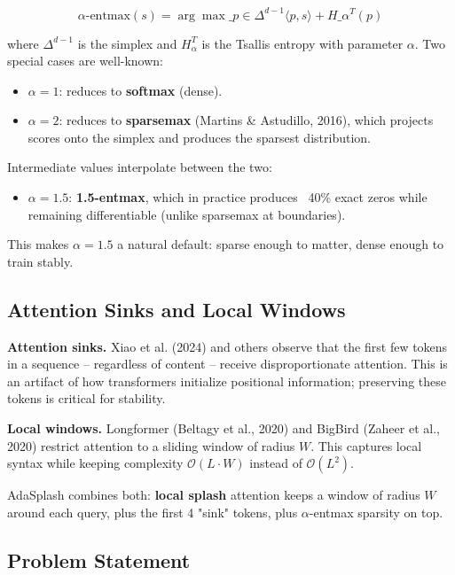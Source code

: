 \[
\text{$\alpha$-entmax}(s) = \arg\max\_{p \in \Delta^{d-1}} \langle p, s \rangle + H\_\alpha^T(p)
\tag{1.2}
\]

where $\Delta^{d-1}$ is the simplex and $H_\alpha^T$ is the Tsallis entropy 
with parameter $\alpha$. Two special cases are well-known:

\begin{itemize}
\item $\alpha = 1$: reduces to \textbf{softmax} (dense).
\item $\alpha = 2$: reduces to \textbf{sparsemax} (Martins \& Astudillo, 2016),
  which projects scores onto the simplex and produces the sparsest
  distribution.

\end{itemize}
Intermediate values interpolate between the two:

\begin{itemize}
\item $\alpha = 1.5$: \textbf{1.5-entmax}, which in practice produces ~40\% exact zeros
  while remaining differentiable (unlike sparsemax at boundaries).

\end{itemize}
This makes $\alpha = 1.5$ a natural default: sparse enough to matter, dense 
enough to train stably.

\subsection{Attention Sinks and Local Windows}

\textbf{Attention sinks.} Xiao et al. (2024) and others observe that the first 
few tokens in a sequence -- regardless of content -- receive disproportionate 
attention. This is an artifact of how transformers initialize positional 
information; preserving these tokens is critical for stability.

\textbf{Local windows.} Longformer (Beltagy et al., 2020) and BigBird (Zaheer et al., 
2020) restrict attention to a sliding window of radius $W$. This captures 
local syntax while keeping complexity $\mathcal{O}(L \cdot W)$ instead of 
$\mathcal{O}(L^2)$.

AdaSplash combines both: \textbf{local splash} attention keeps a window of radius 
$W$ around each query, plus the first 4 "sink" tokens, plus $\alpha$-entmax 
sparsity on top.

\subsection{Problem Statement}


